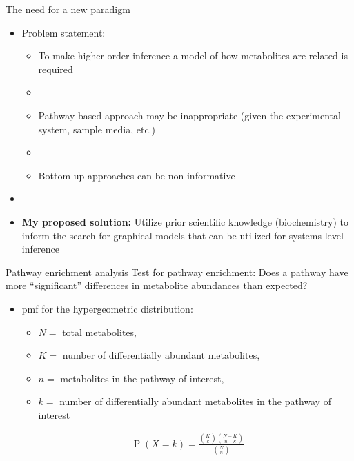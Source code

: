 \documentclass[xcolor=dvipsnames]{beamer}
\DeclareMathOperator{\PP}{P}
\begin{document}
\begin{frame}{The need for a new paradigm}
\vspace{-15.5pt}
\begin{itemize}
	\item Problem statement: \pause
	\begin{itemize}
		\item To make higher-order inference a model of how metabolites are related is required \pause
		\item[]
		\item Pathway-based approach may be inappropriate (given the experimental system, sample media, etc.) \pause
		\item[]
		\item Bottom up approaches can be non-informative \pause

	\end{itemize}
	\item[]
	\item \textbf{My proposed solution:} Utilize prior scientific knowledge (biochemistry) to inform the search for graphical models that can be utilized for systems-level inference
\end{itemize}
\end{frame}

\begin{frame}{Pathway enrichment analysis}
	\vspace{-10pt}
{\Large Test for pathway enrichment: Does a pathway have more ``significant'' differences in metabolite abundances than expected?} \vspace{10pt} \pause

	\begin{itemize}
		\item pmf for the hypergeometric distribution: 
		\begin{itemize}
			\item $N=$ total metabolites,
			\item $K=$ number of differentially abundant metabolites, 
			\item $n=$ metabolites in the pathway of interest, 
			\item $k=$ number of differentially abundant metabolites in the pathway of interest 
		\end{itemize}
		\begin{align*}
		\PP(X=k) = \frac{  {{K}\choose{k}} {{N-K}\choose{n-k}}  }{ {{N}\choose{n}} } 
		\end{align*}
	\end{itemize}
\end{frame}
\end{document}
